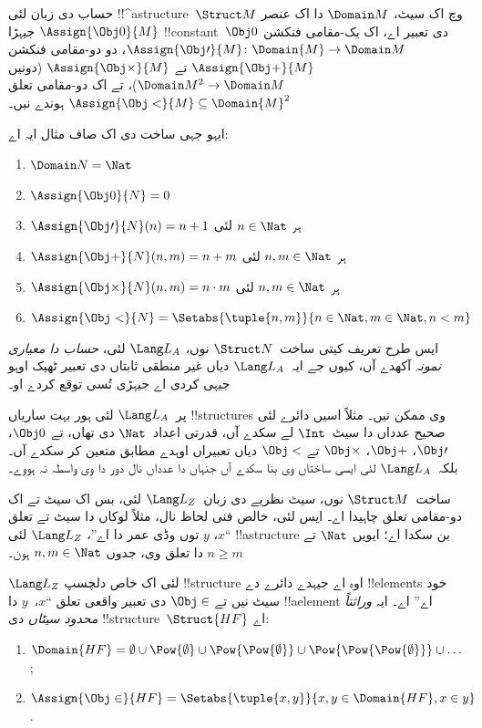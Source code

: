 \documentclass[../../../include/open-logic-section]{subfiles}
\begin{document}
\begin{ex}
حساب دی زبان لئی !!^a{structure}~$\Struct M$ وچ اک سیٹ،
$\Domain M$ دا اک عنصر $\Assign{\Obj 0}{M}$ جیہڑا
!!{constant}~$\Obj 0$ دی تعبیر اے، اک یک-مقامی فنکشن
$\Assign{\Obj \prime}{M} \colon \Domain{M} \to \Domain M$،
دو دو-مقامی فنکشن $\Assign{\Obj +}{M}$ تے $\Assign{\Obj
    \times}{M}$ (دونیں $\Domain M^2 \to \Domain M$)، تے اک
دو-مقامی تعلق $\Assign{\Obj <}{M} \subseteq \Domain{M}^2$ ہوندے نیں۔

ایہو جہی ساخت دی اک صاف مثال ایہ اے:
\begin{enumerate}
\item $\Domain N = \Nat$
\item $\Assign{\Obj 0}{N} = 0$
\item $\Assign{\Obj \prime}{N}(n) = n + 1$ ہر $n \in \Nat$ لئی
\item $\Assign{\Obj +}{N}(n, m) = n + m$ ہر $n, m \in \Nat$ لئی
\item $\Assign{\Obj \times}{N}(n, m) = n\cdot m$ ہر $n, m \in \Nat$ لئی
\item $\Assign{\Obj <}{N} = \Setabs{\tuple{n, m}}{n \in \Nat, m \in
  \Nat, n < m}$
\end{enumerate}
ایس طرح تعریف کیتی ساخت~$\Struct N$ نوں، $\Lang L_A$ لئی،
\emph{حساب دا معیاری نمونہ} آکھدے آں، کیوں جے ایہ~$\Lang L_A$
دیاں غیر منطقی ثابتاں دی تعبیر ٹھیک اوہو جیہی کردی اے جیہڑی
تُسی توقع کردے او۔

پر~$\Lang L_A$ لئی ہور بہت ساریاں !!{structure}s وی ممکن نیں۔
مثلاً اسیں دائرے لئی صحیح عدداں دا سیٹ~$\Int$ لے سکدے آں،
قدرتی اعداد~$\Nat$ دی تھاں، تے $\Obj
0$، $\Obj \prime$، $\Obj +$، $\Obj \times$ تے $\Obj <$
دیاں تعبیراں اوہدے مطابق متعین کر سکدے آں۔ بلکہ~$\Lang L_A$
لئی ایسی ساختاں وی بنا سکدے آں جنہاں دا عدداں نال دور دا وی
واسطہ نہ ہووے۔
\end{ex}

\begin{ex}
ساخت~$\Struct M$ نوں، سیٹ نظریے دی زبان~$\Lang L_Z$ لئی،
بس اک سیٹ تے اک دو-مقامی تعلق چاہیدا اے۔ ایس لئی، خالص فنی
لحاظ نال، مثلاً لوکاں دا سیٹ تے تعلق ``$x$، $y$ توں وڈی عمر
دا اے''، $\Lang L_Z$ لئی !!a{structure} بن سکدا اے؛ ایویں
$\Nat$ تے $n \ge m$ دا تعلق وی، جدوں $n, m \in \Nat$ ہون۔

$\Lang L_Z$ لئی اک خاص دلچسپ !!{structure} اوہ اے جیہدے دائرے دے
!!{element}s خود سیٹ نیں تے $\Obj \in$ دی تعبیر واقعی تعلق
``$x$،~$y$ دا !!a{element} اے'' اے۔ ایہ \emph{وراثتاً محدود سیٹاں}
دی !!{structure}~$\Struct{{HF}}$ اے:
\begin{enumerate}
\item $\Domain{{{HF}}} = \emptyset \cup \Pow{\emptyset} \cup
  \Pow{\Pow{\emptyset}} \cup \Pow{\Pow{\Pow{\emptyset}}} \cup \dots$;
\item $\Assign{\Obj \in}{{{HF}}} = \Setabs{\tuple{x, y}}{x, y \in
  \Domain{{{HF}}}, x \in y}$.
\end{enumerate}
\end{ex}
\end{document}
